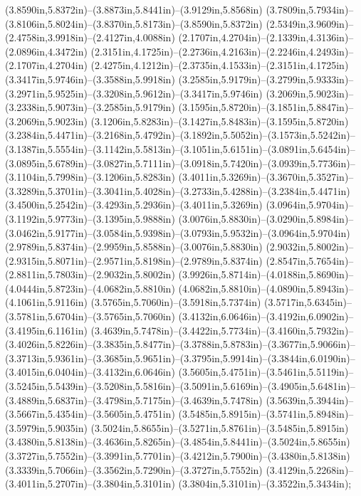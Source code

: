(3.8590in,5.8372in)--(3.8873in,5.8441in)--(3.9129in,5.8568in) (3.7809in,5.7934in)--(3.8106in,5.8024in)--(3.8370in,5.8173in)--(3.8590in,5.8372in) (2.5349in,3.9609in)--(2.4758in,3.9918in)--(2.4127in,4.0088in) (2.1707in,4.2704in)--(2.1339in,4.3136in)--(2.0896in,4.3472in) (2.3151in,4.1725in)--(2.2736in,4.2163in)--(2.2246in,4.2493in)--(2.1707in,4.2704in) (2.4275in,4.1212in)--(2.3735in,4.1533in)--(2.3151in,4.1725in) (3.3417in,5.9746in)--(3.3588in,5.9918in) (3.2585in,5.9179in)--(3.2799in,5.9333in)--(3.2971in,5.9525in)--(3.3208in,5.9612in)--(3.3417in,5.9746in) (3.2069in,5.9023in)--(3.2338in,5.9073in)--(3.2585in,5.9179in) (3.1595in,5.8720in)--(3.1851in,5.8847in)--(3.2069in,5.9023in) (3.1206in,5.8283in)--(3.1427in,5.8483in)--(3.1595in,5.8720in) (3.2384in,5.4471in)--(3.2168in,5.4792in)--(3.1892in,5.5052in)--(3.1573in,5.5242in)--(3.1387in,5.5554in)--(3.1142in,5.5813in)--(3.1051in,5.6151in)--(3.0891in,5.6454in)--(3.0895in,5.6789in)--(3.0827in,5.7111in)--(3.0918in,5.7420in)--(3.0939in,5.7736in)--(3.1104in,5.7998in)--(3.1206in,5.8283in) (3.4011in,5.3269in)--(3.3670in,5.3527in)--(3.3289in,5.3701in)--(3.3041in,5.4028in)--(3.2733in,5.4288in)--(3.2384in,5.4471in) (3.4500in,5.2542in)--(3.4293in,5.2936in)--(3.4011in,5.3269in) (3.0964in,5.9704in)--(3.1192in,5.9773in)--(3.1395in,5.9888in) (3.0076in,5.8830in)--(3.0290in,5.8984in)--(3.0462in,5.9177in)--(3.0584in,5.9398in)--(3.0793in,5.9532in)--(3.0964in,5.9704in) (2.9789in,5.8374in)--(2.9959in,5.8588in)--(3.0076in,5.8830in) (2.9032in,5.8002in)--(2.9315in,5.8071in)--(2.9571in,5.8198in)--(2.9789in,5.8374in) (2.8547in,5.7654in)--(2.8811in,5.7803in)--(2.9032in,5.8002in) (3.9926in,5.8714in)--(4.0188in,5.8690in)--(4.0444in,5.8723in)--(4.0682in,5.8810in) (4.0682in,5.8810in)--(4.0890in,5.8943in)--(4.1061in,5.9116in) (3.5765in,5.7060in)--(3.5918in,5.7374in) (3.5717in,5.6345in)--(3.5781in,5.6704in)--(3.5765in,5.7060in) (3.4132in,6.0646in)--(3.4192in,6.0902in)--(3.4195in,6.1161in) (3.4639in,5.7478in)--(3.4422in,5.7734in)--(3.4160in,5.7932in)--(3.4026in,5.8226in)--(3.3835in,5.8477in)--(3.3788in,5.8783in)--(3.3677in,5.9066in)--(3.3713in,5.9361in)--(3.3685in,5.9651in)--(3.3795in,5.9914in)--(3.3844in,6.0190in)--(3.4015in,6.0404in)--(3.4132in,6.0646in) (3.5605in,5.4751in)--(3.5461in,5.5119in)--(3.5245in,5.5439in)--(3.5208in,5.5816in)--(3.5091in,5.6169in)--(3.4905in,5.6481in)--(3.4889in,5.6837in)--(3.4798in,5.7175in)--(3.4639in,5.7478in) (3.5639in,5.3944in)--(3.5667in,5.4354in)--(3.5605in,5.4751in) (3.5485in,5.8915in)--(3.5741in,5.8948in)--(3.5979in,5.9035in) (3.5024in,5.8655in)--(3.5271in,5.8761in)--(3.5485in,5.8915in) (3.4380in,5.8138in)--(3.4636in,5.8265in)--(3.4854in,5.8441in)--(3.5024in,5.8655in) (3.3727in,5.7552in)--(3.3991in,5.7701in)--(3.4212in,5.7900in)--(3.4380in,5.8138in) (3.3339in,5.7066in)--(3.3562in,5.7290in)--(3.3727in,5.7552in) (3.4129in,5.2268in)--(3.4011in,5.2707in)--(3.3804in,5.3101in) (3.3804in,5.3101in)--(3.3522in,5.3434in);
